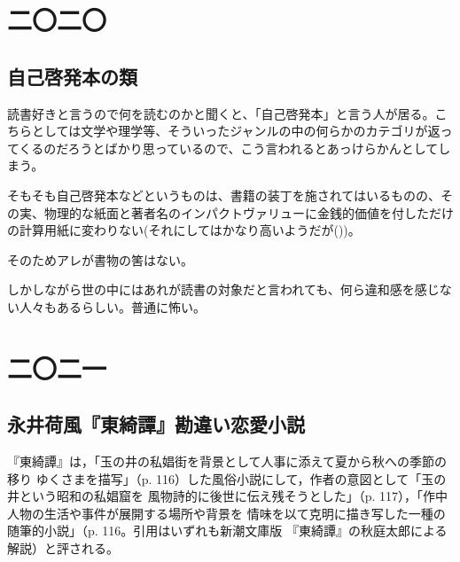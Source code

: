 \documentclass[b5paper,12pt]{tarticle}
\begin{document}
\tableofcontents
\section*{二〇二〇}
\subsection*{自己啓発本の類}
読書好きと言うので何を読むのかと聞くと、「自己啓発本」と言う人が居る。こちらとしては文学や理学等、そういったジャンルの中の何らかのカテゴリが返ってくるのだろうとばかり思っているので、こう言われるとあっけらかんとしてしまう。

そもそも自己啓発本などというものは、書籍の装丁を施されてはいるものの、その実、物理的な紙面と著者名のインパクトヴァリューに金銭的価値を付しただけの計算用紙に変わりない(それにしてはかなり高いようだが())。

そのためアレが書物の筈はない。

しかしながら世の中にはあれが読書の対象だと言われても、何ら違和感を感じない人々もあるらしい。普通に怖い。


\section*{二〇二一}
\subsection*{永井荷風『東綺譚』勘違い恋愛小説}
『東綺譚』は，「玉の井の私娼街を背景として人事に添えて夏から秋への季節の移り
ゆくさまを描写」（p. 116）した風俗小説にして，作者の意図として「玉の井という昭和の私娼窟を
風物詩的に後世に伝え残そうとした」（p. 117），「作中人物の生活や事件が展開する場所や背景を
情味を以て克明に描き写した一種の随筆的小説」（p. 116。引用はいずれも新潮文庫版
『東綺譚』の秋庭太郎による解説）と評される。
\end{document}
